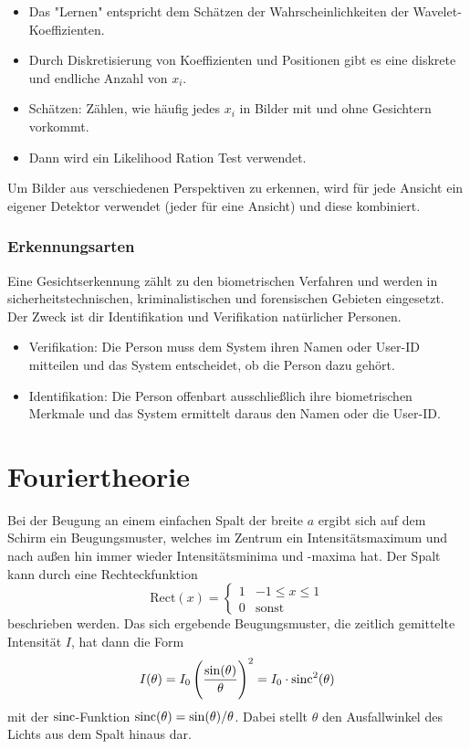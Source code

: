 \begin{enumerate}
\begin{itemize}
\begin{itemize}
							\end{itemize}
						\item Das "Lernen" entspricht dem Schätzen der Wahrscheinlichkeiten der Wavelet-Koeffizienten.
						\item Durch Diskretisierung von Koeffizienten und Positionen gibt es eine diskrete und endliche Anzahl von \(x_i\).
						\item Schätzen: Zählen, wie häufig jedes \(x_i\) in Bilder mit und ohne Gesichtern vorkommt.
						\item Dann wird ein Likelihood Ration Test verwendet.
					\end{itemize}
			\end{enumerate}

			Um Bilder aus verschiedenen Perspektiven zu erkennen, wird für jede Ansicht ein eigener Detektor verwendet (jeder für eine Ansicht) und diese kombiniert.

		\subsection{Erkennungsarten}
			Eine Gesichtserkennung zählt zu den biometrischen Verfahren und werden \bspw in sicherheitstechnischen, kriminalistischen und forensischen Gebieten eingesetzt. Der Zweck ist dir Identifikation und Verifikation natürlicher Personen.
			\begin{itemize}
				\item Verifikation: Die Person muss dem System ihren Namen oder User-ID mitteilen und das System entscheidet, ob die Person dazu gehört.
				\item Identifikation: Die Person offenbart ausschließlich ihre biometrischen Merkmale und das System ermittelt daraus den Namen oder die User-ID.
			\end{itemize}

\chapter{Fouriertheorie}
	Bei der Beugung an einem einfachen Spalt der breite \(a\) ergibt sich auf dem Schirm ein Beugungsmuster, welches im Zentrum ein Intensitätsmaximum und nach außen hin immer wieder Intensitätsminima und -maxima hat. Der Spalt kann durch eine Rechteckfunktion
	\begin{equation*}
		\text{Rect}(x) =
		\begin{cases}
			1 & -1 \leq x \leq 1 \\
			0 & \text{sonst}
		\end{cases}
	\end{equation*}
	beschrieben werden. Das sich ergebende Beugungsmuster, \bzw die zeitlich gemittelte Intensität \(I\), hat dann die Form
	\begin{equation*}
		I(\theta) = I_0 \, \Bigg( \frac{\sin(\theta)}{\theta} \Bigg)^2 = I_0 \cdot \operatorname{sinc}^2(\theta)
	\end{equation*}
	mit der \(\operatorname{sinc}\)-Funktion \( \operatorname{sinc}(\theta) = \sin(\theta) / \theta \). Dabei stellt \(\theta\) den Ausfallwinkel des Lichts aus dem Spalt hinaus dar.

